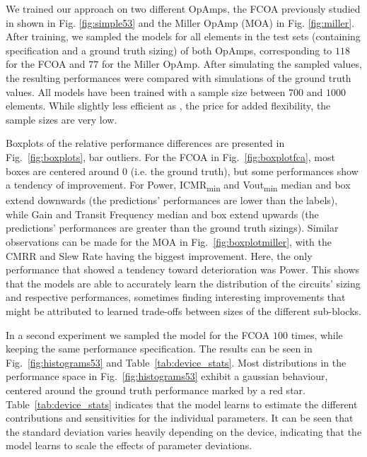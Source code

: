 \documentclass[conference]{IEEEtran}
\begin{document}
	We trained our approach on two different OpAmps, the FCOA previously studied in \cite{leibl24inverse} shown in Fig. \ref{fig:simple53} and the Miller OpAmp (MOA) in Fig. \ref{fig:miller}. %
	After training, we sampled the models for all elements in the test sets (containing specification and a ground truth sizing) of both OpAmps, corresponding to $118$ for the FCOA and $77$ for the Miller OpAmp. 
	After simulating the sampled values, the resulting performances were compared with simulations of the ground truth values. 
	All models have been trained with a sample size between $700$ and $1000$ elements. While slightly less efficient as \cite{leibl24inverse}, the price for added flexibility, the sample sizes are very low.
	
	Boxplots of the relative performance differences are presented in Fig.~\ref{fig:boxplots}, bar outliers.
	For the FCOA in Fig.~\ref{fig:boxplotfca}, most boxes are centered around $0$ (i.e. the ground truth), but some performances show a tendency of improvement. For Power, ICMR\textsubscript{min} and Vout\textsubscript{min} median and box extend downwards (the predictions' performances are lower than the labels), while Gain and Transit Frequency median and box extend upwards (the predictions' performances are greater than the ground truth sizings). Similar observations can be made for the MOA in Fig.~\ref{fig:boxplotmiller}, with the CMRR and Slew Rate having the biggest improvement. Here, the only performance that showed a tendency toward deterioration was Power. This shows that the models are able to accurately learn the distribution of the circuits' sizing and respective performances, sometimes finding interesting improvements that might be attributed to learned trade-offs between sizes of the different sub-blocks.
	
	In a second experiment we sampled the model for the FCOA $100$ times, while keeping the same performance specification. The results can be seen in Fig.~\ref{fig:histograms53} and Table~\ref{tab:device_stats}. Most distributions in the performance space in Fig.~\ref{fig:histograms53} exhibit a gaussian behaviour, centered around the ground truth performance marked by a red star. Table~\ref{tab:device_stats} indicates that the model learns to estimate the different contributions and sensitivities for the individual parameters. It can be seen that the standard deviation varies heavily depending on the device, indicating that the model learns to scale the effects of parameter deviations.
\end{document}
